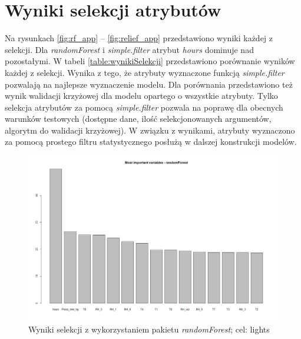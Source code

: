 \documentclass[a4paper,11pt,twoside]{mwrep}  %
\begin{document}
\section{Wyniki selekcji atrybutów}

Na rysunkach \ref{fig:rf_app} -- \ref{fig:relief_app} przedstawiono wyniki każdej z selekcji. Dla \textit{randomForest} i \textit{simple.filter} atrybut \textit{hours} dominuje nad pozostałymi. W tabeli \ref{table:wynikiSelekcji} przedstawiono porównanie wyników każdej z selekcji. Wynika z tego, że atrybuty wyznaczone funkcją \textit{simple.filter} pozwalają na najlepsze wyznaczenie modelu. Dla porównania przedstawiono też wynik walidacji krzyżowej dla modelu opartego o wszystkie atrybuty. Tylko selekcja atrybutów za pomocą \textit{simple.filter} pozwala na poprawę dla obecnych warunków testowych (dostępne dane, ilość selekcjonowanych argumentów, algorytm do walidacji krzyżowej). W związku z wynikami, atrybuty wyznaczono za pomocą prostego filtru statystycznego posłużą w dalszej konstrukcji modelów.

 \begin{figure}[!h]
    \centering \includegraphics[scale=0.4]{../rf_lights.png}
    \caption{Wyniki selekcji z wykorzystaniem pakietu \textit{randomForest}; cel: lights}
    \label{fig:rf_lights}
\end{figure}
\end{document}
